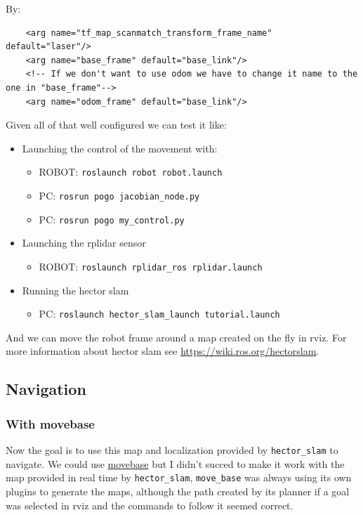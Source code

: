 \documentclass{article}
\begin{document}
By:
\begin{verbatim}
    <arg name="tf_map_scanmatch_transform_frame_name" default="laser"/>
    <arg name="base_frame" default="base_link"/>
    <!-- If we don't want to use odom we have to change it name to the one in "base_frame"-->
    <arg name="odom_frame" default="base_link"/>
\end{verbatim}
 
Given all of that well configured we can test it like:

\begin{itemize}
    \item Launching the control of the movement with:
    \begin{itemize}
        \item ROBOT: \verb|roslaunch robot robot.launch|
        \item PC: \verb|rosrun pogo jacobian_node.py|
        \item PC: \verb|rosrun pogo my_control.py|
    \end{itemize}
    \item Launching the rplidar sensor
    \begin{itemize}
        \item ROBOT: \verb|roslaunch rplidar_ros rplidar.launch|
    \end{itemize}
    
    \item Running the hector slam
    \begin{itemize}
        \item PC: \verb|roslaunch hector_slam_launch tutorial.launch|
    \end{itemize}
\end{itemize}

And we can move the robot frame around a map created on the fly in rviz. For more information about hector slam see \href{https://wiki.ros.org/hector_slam}{https://wiki.ros.org/hector\textunderscore slam}.

\subsection{Navigation}

\subsubsection{With move\textunderscore base}
Now the goal is to use this map and localization provided by \verb|hector_slam| to navigate. We could use \href{http://wiki.ros.org/move_base}{move\textunderscore base} but I didn't succed to make it work with the map provided in real time by \verb|hector_slam|, \verb|move_base| was always using its own plugins to generate the maps, although the path created by its planner if a goal was selected in rviz and the commands to follow it seemed correct. 
\end{document}
